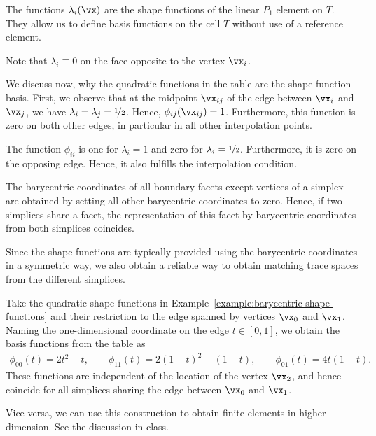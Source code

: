 \begin{example}
  The functions $\lambda_i(\vx)$ are the shape functions of the linear
  $P_1$ element on $T$. They allow us to define basis functions on the
  cell $T$ without use of a reference element.

  Note that $\lambda_i\equiv 0$ on the face opposite to the
  vertex $\vx_i$.
  
  We discuss now, why the quadratic functions in the table are the
  shape function basis. First, we observe that at the midpoint
  $\vx_{ij}$ of the edge between $\vx_i$ and $\vx_j$, we have
  $\lambda_i = \lambda_j = \nicefrac12$. Hence,
  $\phi_{ij}(\vx_{ij}) = 1$. Furthermore, this function is zero on
  both other edges, in particular in all other interpolation points.

  The function $\phi_{ii}$ is one for $\lambda_i = 1$ and zero for
  $\lambda_i=\nicefrac12$. Furthermore, it is zero on the opposing
  edge. Hence, it also fulfills the interpolation condition.
\end{example}

\begin{remark}
  The barycentric coordinates of all boundary facets except vertices
  of a simplex are obtained by setting all other barycentric
  coordinates to zero. Hence, if two simplices share a facet, the
  representation of this facet by barycentric coordinates from both
  simplices coincides.

  Since the shape functions are typically provided using the
  barycentric coordinates in a symmetric way, we also obtain a
  reliable way to obtain matching trace spaces from the different
  simplices.
\end{remark}

\begin{example}
  Take the quadratic shape functions in
  Example~\ref{example:barycentric-shape-functions} and their
  restriction to the edge spanned by vertices $\vx_0$ and
  $\vx_1$. Naming the one-dimensional coordinate on the edge
  $t\in[0,1]$, we obtain the basis functions from the table as
  \begin{gather}
    \phi_{00}(t) = 2t^2-t,\qquad
    \phi_{11}(t) = 2(1-t)^2 - (1-t),
    \qquad
    \phi_{01}(t) = 4t(1-t).
  \end{gather}
  These functions are independent of the location of the vertex
  $\vx_2$, and hence coincide for all simplices sharing the edge
  between $\vx_0$ and $\vx_1$.
\end{example}

\begin{example}
  Vice-versa, we can use this construction to obtain finite elements
  in higher dimension. See the discussion in class.
\end{example}


